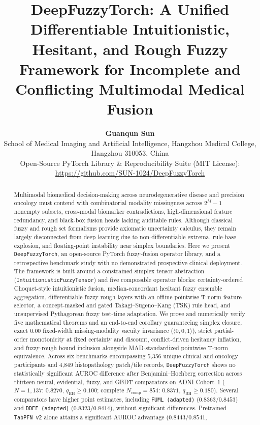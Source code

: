 \documentclass[10pt,twocolumn]{article}
\title{\vspace{-1.0em}%
\textbf{DeepFuzzyTorch: A Unified Differentiable Intuitionistic, Hesitant, and Rough Fuzzy
Framework for Incomplete and Conflicting Multimodal Medical Fusion}}
\author{
\textbf{Guanqun Sun}\\
\small School of Medical Imaging and Artificial Intelligence, Hangzhou Medical College,
Hangzhou 310053, China\\
\small Open-Source PyTorch Library \& Reproducibility Suite (MIT License):
\url{https://github.com/SUN-1024/DeepFuzzyTorch}
}
\date{}
\begin{document}
\maketitle

\begin{abstract}
Multimodal biomedical decision-making across neurodegenerative disease and precision oncology
must contend with combinatorial modality missingness across $2^M-1$ nonempty subsets,
cross-modal biomarker contradictions, high-dimensional feature redundancy, and black-box fusion
heads lacking auditable rules. Although classical fuzzy and rough set formalisms provide
axiomatic uncertainty calculus, they remain largely disconnected from deep learning due to
non-differentiable extrema, rule-base explosion, and floating-point instability near simplex
boundaries. Here we present \texttt{DeepFuzzyTorch}, an open-source PyTorch fuzzy-fusion
operator library, and a retrospective benchmark study with no demonstrated prospective
clinical deployment. The framework is built around a constrained simplex tensor
abstraction (\texttt{Intuitionistic\allowbreak Fuzzy\allowbreak Tensor}) and five composable
operator blocks: certainty-ordered Choquet-style intuitionistic fusion, median-concordant
hesitant fuzzy ensemble aggregation, differentiable fuzzy-rough layers with an offline
pointwise T-norm feature selector, a concept-masked and gated Takagi--Sugeno--Kang (TSK) rule
head, and unsupervised
Pythagorean fuzzy test-time adaptation. We prove and numerically verify five mathematical
theorems and an end-to-end corollary guaranteeing simplex closure, exact $0.00$ fixed-width
missing-modality vacuity invariance ($\langle 0,0,1\rangle$), strict partial-order monotonicity
at fixed certainty and discount, conflict-driven hesitancy inflation, and fuzzy-rough bound
inclusion alongside MAD-standardized pointwise T-norm equivalence. Across six benchmarks
encompassing 5,356 unique clinical and oncology participants and 4,849 histopathology
patch/tile records, \texttt{DeepFuzzyTorch} shows no statistically significant AUROC difference
after Benjamini--Hochberg correction across thirteen neural, evidential, fuzzy, and GBDT
comparators on ADNI Cohort~1 ($N=1,137$: $0.8270$, $q_{\text{BH}}\ge 0.100$; complete
$N_{\text{comp}}=854$: $0.8371$, $q_{\text{BH}}\ge 0.180$). Several comparators have higher
point estimates, including \texttt{FUML (adapted)} ($0.8363/0.8453$) and
\texttt{DDEF (adapted)} ($0.8323/0.8414$), without significant differences. Pretrained
\texttt{TabPFN~v2} alone attains a significant AUROC advantage ($0.8443/0.8541$,

\end{abstract}
\end{document}
